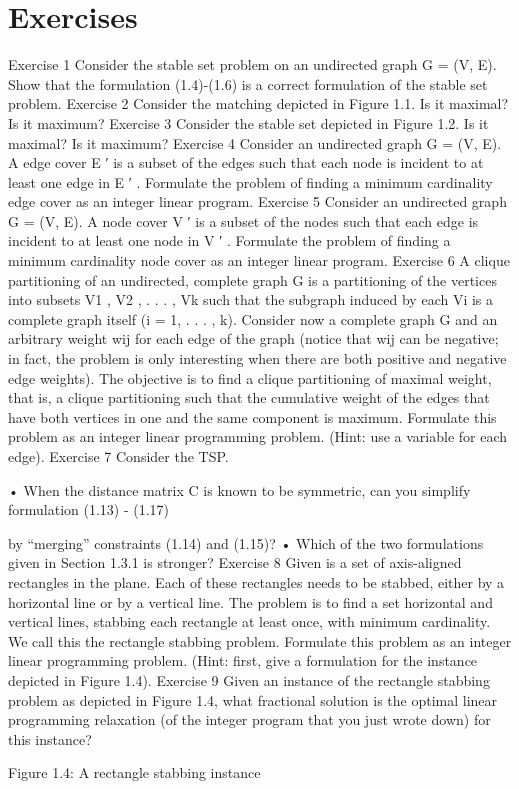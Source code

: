 \documentclass[titlepage]{book}
\begin{document}
\section*{Exercises}
Exercise 1
Consider the stable set problem on an undirected graph G = (V, E). Show that the formulation (1.4)-(1.6)
is a correct formulation of the stable set problem.
Exercise 2
Consider the matching depicted in Figure 1.1. Is it maximal? Is it maximum?
Exercise 3
Consider the stable set depicted in Figure 1.2. Is it maximal? Is it maximum?
Exercise 4
Consider an undirected graph G = (V, E). A edge cover E ′ is a subset of the edges such that each node is
incident to at least one edge in E ′ . Formulate the problem of finding a minimum cardinality edge cover
as an integer linear program.
Exercise 5
Consider an undirected graph G = (V, E). A node cover V ′ is a subset of the nodes such that each edge
is incident to at least one node in V ′ . Formulate the problem of finding a minimum cardinality node
cover as an integer linear program.
Exercise 6
A clique partitioning of an undirected, complete graph G is a partitioning of the vertices into subsets
V1 , V2 , . . . , Vk such that the subgraph induced by each Vi is a complete graph itself (i = 1, . . . , k). Consider
now a complete graph G and an arbitrary weight wij for each edge of the graph (notice that wij can be
negative; in fact, the problem is only interesting when there are both positive and negative edge weights).
The objective is to find a clique partitioning of maximal weight, that is, a clique partitioning such that
the cumulative weight of the edges that have both vertices in one and the same component is maximum.
Formulate this problem as an integer linear programming problem. (Hint: use a variable for each edge).
Exercise 7
Consider the TSP.

• When the distance matrix C is known to be symmetric, can you simplify formulation (1.13) - (1.17)

by “merging” constraints (1.14) and (1.15)?
• Which of the two formulations given in Section 1.3.1 is stronger?
Exercise 8
Given is a set of axis-aligned rectangles in the plane. Each of these rectangles needs to be stabbed, either
by a horizontal line or by a vertical line. The problem is to find a set horizontal and vertical lines, stabbing
each rectangle at least once, with minimum cardinality. We call this the rectangle stabbing problem.
Formulate this problem as an integer linear programming problem. (Hint: first, give a formulation for
the instance depicted in Figure 1.4).
Exercise 9
Given an instance of the rectangle stabbing problem as depicted in Figure 1.4, what fractional solution
is the optimal linear programming relaxation (of the integer program that you just wrote down) for this
instance?

Figure 1.4: A rectangle stabbing instance



\end{document}
